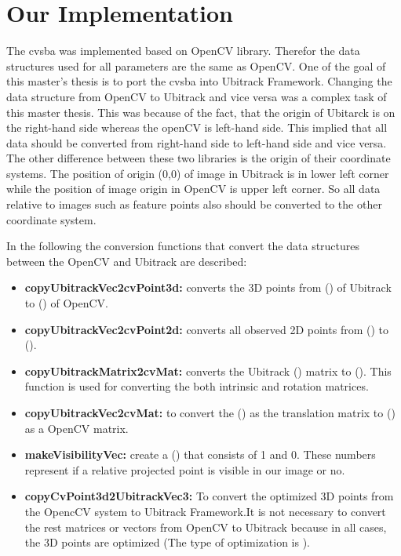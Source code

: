 \section{Our Implementation}
The cvsba was implemented based on OpenCV library. Therefor the data structures used for all parameters are the same as OpenCV. One of the goal of this master's thesis is to port the cvsba into Ubitrack Framework. Changing the data structure from OpenCV to Ubitrack and vice versa was a complex task of this master thesis. This was because of the fact, that the origin of Ubitarck is on the right-hand side whereas the openCV is left-hand side. This implied that all data should be converted from right-hand side to left-hand side and vice versa. The other difference between these two libraries is the origin of their coordinate systems. The position of origin (0,0) of image in Ubitrack is in lower left corner while the position of image origin in OpenCV is upper left corner. So all data relative to images such as feature points also should be converted to the other coordinate system.

In the following the conversion functions that convert the data structures between the OpenCV and Ubitrack are described:
\begin{itemize}
\item \textbf{copyUbitrackVec2cvPoint3d:} converts the 3D points from  () of Ubitrack to () of OpenCV. 
\item \textbf{copyUbitrackVec2cvPoint2d:} converts all observed 2D points from () to ().
\item \textbf{copyUbitrackMatrix2cvMat:} converts the Ubitrack () matrix to (). This function is used for converting the both intrinsic and rotation matrices.
\item \textbf{copyUbitrackVec2cvMat:} to convert the () as the translation matrix to () as a OpenCV matrix.
\item \textbf{makeVisibilityVec:} create a () that consists of 1 and 0. These numbers represent if a relative projected point is visible in our image or no.
\item \textbf{copyCvPoint3d2UbitrackVec3:} To convert the optimized 3D points from the OpencCV system to Ubitrack Framework.It is not necessary to convert the rest matrices or vectors from OpenCV to Ubitrack because in all cases, the 3D points are optimized (The type of optimization is ).
\end{itemize}

